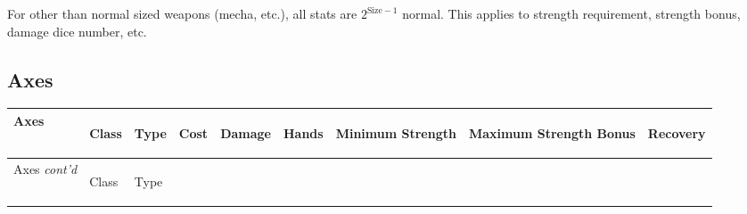 \documentclass[twoside]{book}
\begin{document}
    {  
      For other than normal sized weapons (mecha, etc.),
               all stats are \begin{math}
                  { 2 }^{  \textrm{Size}   -
                      1   }  \end{math}  normal. This applies to strength
                  requirement, strength bonus, damage dice number, etc.
            
    }
  
    

\subsection{Axes}
    
\begin{longtable}{p{1.25in}llllp{2em}p{3em}p{3em}l} 
  Axes
  &
  \begin{turn}{70}{Class}\end{turn}
          
  &
  \begin{turn}{70}{Type}\end{turn}
          
  &
  \begin{turn}{70}{Cost}\end{turn}
          
  &
  \begin{turn}{70}{Damage}\end{turn}
          
  &
  \begin{turn}{70}{Hands}\end{turn}
          
  &
  \begin{turn}{70}{Minimum Strength}\end{turn}
          
  &
  \begin{turn}{70}{Maximum Strength Bonus}\end{turn}
          
  &
  \begin{turn}{70}{Recovery}\end{turn}
          
  \\
  \hline
  \hline
  \endfirsthead
  Axes \textit{cont'd}
        
  &
  \begin{turn}{70}{Class}\end{turn}
          
  &
  \begin{turn}{70}{Type}\end{turn}
          

\end{longtable}
\end{document}
